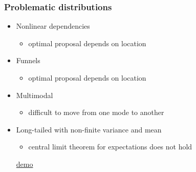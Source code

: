 \documentclass[10pt]{beamer}
\begin{document}
\begin{frame}

\frametitle{Problematic distributions}

  \begin{itemize}
  \item<1-> Nonlinear dependencies
    \begin{itemize}
    \item optimal proposal depends on location
    \end{itemize}
  \item<2-> Funnels
    \begin{itemize}
    \item optimal proposal depends on location
    \end{itemize}
  \item<3-> Multimodal
    \begin{itemize}
    \item difficult to move from one mode to another
    \end{itemize}
  \item<4-> Long-tailed with non-finite variance and mean
    \begin{itemize}
    \item central limit theorem for expectations does not hold
    \end{itemize}
    \begin{center}
      \href{https://chi-feng.github.io/mcmc-demo/app.html?algorithm=RandomWalkMH&target=standard}{demo}
    \end{center}
  \end{itemize}

\end{frame}

\end{document}
